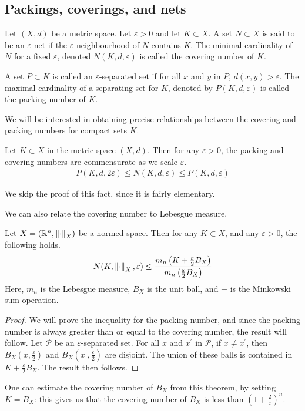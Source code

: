 \documentclass[11pt]{article}
\begin{document}
\subsection*{Packings, coverings, and nets}

\begin{definition}
  Let $(X, d)$ be a metric space.
  Let $\varepsilon > 0$ and let $K \subset X$.
  A set $N \subset X$ is said to be an $\varepsilon$-net if the $\varepsilon$-neighbourhood of $N$ contains $K$.
  The minimal cardinality of $N$ for a fixed $\varepsilon$, denoted $N(K, d, \varepsilon)$ is called the covering number of $K$.
\end{definition}

\begin{definition}
  A set $P \subset K$ is called an $\varepsilon$-separated set if for all $x$ and $y$ in $P$, $d(x,y) > \varepsilon$.
  The maximal cardinality of a separating set for $K$, denoted by $P(K, d, \varepsilon)$ is called the packing number of $K$.
\end{definition}

We will be interested in obtaining precise relationships between the covering and packing numbers for compact sets $K$.

\begin{lemma}
  Let $K \subset X$ in the metric space $(X, d)$.
  Then for any $\varepsilon > 0$, the packing and covering numbers are commensurate as we scale $\varepsilon$.
  \begin{align*}
    P(K, d, 2 \varepsilon) \leq N(K, d, \varepsilon) \leq P(K, d, \varepsilon)
  \end{align*}
\end{lemma}
We skip the proof of this fact, since it is fairly elementary.

We can also relate the covering number to Lebesgue measure.
\begin{theorem}
  Let $X = \left( \mathbb{R}^n, \left\lVert\cdot\right\rVert_X \right)$ be a normed space.
  Then for any $K \subset X$, and any $\varepsilon > 0$, the following holds.
  \begin{align*}
    N(K, \left\lVert\cdot\right\rVert_X, \varepsilon) \leq \frac{m_n\left( K+\frac{\varepsilon}{2}B_X \right)}{m_n \left( \frac{\varepsilon}{2}B_X \right)}
  \end{align*}
  Here, $m_n$ is the Lebesgue measure, $B_X$ is the unit ball, and $+$ is the Minkowski sum operation.
\end{theorem}
\begin{proof}
  We will prove the inequality for the packing number, and since the packing number is always greater than or equal to the covering number, the result will follow.
  Let $\mathcal{P}$ be an $\varepsilon$-separated set.
  For all $x$ and $x^{\prime}$ in $\mathcal{P}$, if $x \neq x^{\prime}$, then $B_X\left( x, \frac{\varepsilon}{2} \right)$ and $B_X\left( x^{\prime}, \frac{\varepsilon}{2} \right)$ are disjoint.
  The union of these balls is contained in $K + \frac{\varepsilon}{2}B_X$.
  The result then follows.
\end{proof}
One can estimate the covering number of $B_X$ from this theorem, by setting $K = B_X$: this gives us that the covering number of $B_X$ is less than $\left( 1 + \frac{2}{\varepsilon} \right)^n$.
\end{document}
